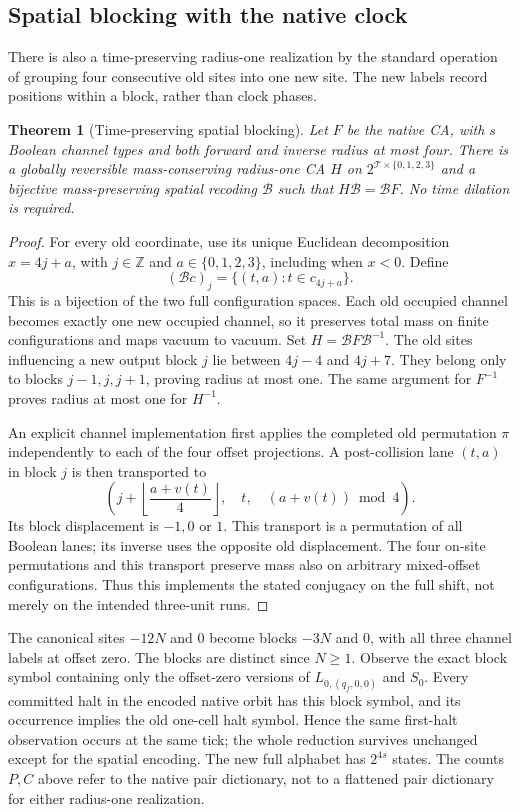 \documentclass[11pt,letterpaper]{article}
\numberwithin{equation}{section}
\newtheorem{theorem}{Theorem}[section]
\theoremstyle{definition}
\theoremstyle{remark}
\newcommand{\Z}{\mathbb Z}
\begin{document}
\subsection{Spatial blocking with the native clock}\label{smc:tm:sec:spatial-blocking}

There is also a time-preserving radius-one realization by the standard
operation of grouping four consecutive old sites into one new site.
The new labels record positions within a block, rather than clock phases.

\begin{theorem}[Time-preserving spatial blocking]\label{smc:tm:thm:blocking}
Let $F$ be the native CA, with $s$ Boolean channel types and both forward
and inverse radius at most four. There is a globally reversible
mass-conserving radius-one CA $H$ on $2^{\mathcal T\times\{0,1,2,3\}}$
and a bijective mass-preserving spatial recoding $\mathcal B$ such that
$H\mathcal B=\mathcal B F$. No time dilation is required.
\end{theorem}
\begin{proof}
For every old coordinate, use its unique Euclidean decomposition
$x=4j+a$, with $j\in\Z$ and $a\in\{0,1,2,3\}$, including when $x<0$.
Define
\[
(\mathcal Bc)_j=\{(t,a):t\in c_{4j+a}\}.
\]
This is a bijection of the two full configuration spaces. Each old
occupied channel becomes exactly one new occupied channel, so it
preserves total mass on finite configurations and maps vacuum to vacuum.
Set $H=\mathcal BF\mathcal B^{-1}$. The old sites influencing a new
output block $j$ lie between $4j-4$ and $4j+7$. They belong only to
blocks $j-1,j,j+1$, proving radius at most one. The same argument for
$F^{-1}$ proves radius at most one for $H^{-1}$.

An explicit channel implementation first applies the completed old
permutation $\pi$ independently to each of the four offset projections.
A post-collision lane $(t,a)$ in block $j$ is then transported to
\[
\left(j+\left\lfloor\frac{a+v(t)}4\right\rfloor,
\quad t,\quad (a+v(t))\bmod4\right).
\]
Its block displacement is $-1,0$ or $1$. This transport is a permutation
of all Boolean lanes; its inverse uses the opposite old displacement.
The four on-site permutations and this transport preserve mass also on
arbitrary mixed-offset configurations. Thus this implements the stated
conjugacy on the full shift, not merely on the intended three-unit runs.
\end{proof}

The canonical sites $-12N$ and $0$ become blocks $-3N$ and $0$, with
all three channel labels at offset zero. The blocks are distinct since
$N\ge1$. Observe the exact block symbol containing only the offset-zero
versions of $L_{0,(q_f,0,0)}$ and $S_0$. Every committed halt in the
encoded native orbit has this block symbol, and its occurrence implies
the old one-cell halt symbol. Hence the same first-halt observation
occurs at the same tick; the whole reduction survives unchanged except
for the spatial encoding. The new full alphabet has $2^{4s}$ states.
The counts $P,C$ above refer to the native pair dictionary, not to a
flattened pair dictionary for either radius-one realization.
\end{document}
